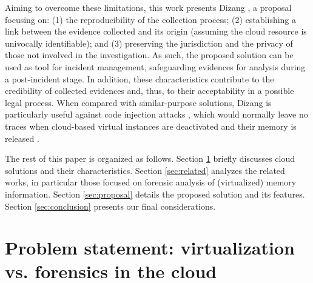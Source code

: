 \documentclass[conference]{IEEEtran}
\newcommand{\marcos}[1]{{\color{green}{MARCOS: #1}}}
\newcommand{\fancyname}{Dizang }
\newcommand{\fancynameX}{\fancyname}
\begin{document}
%
Aiming to overcome these limitations, this work presents \fancynameX, a proposal focusing on: (1) the reproducibility of the collection process; (2) establishing a link between the evidence collected and its origin (assuming the cloud resource is univocally identifiable); and (3) preserving the jurisdiction and the privacy of those not involved in the investigation.
%
As such, the proposed solution can be used as tool for incident management, safeguarding evidences for analysis during a post-incident stage.
%
In addition, these characteristics contribute to the credibility of collected evidences and, thus, to their acceptability in a possible legal process.
%
%
%
When compared with similar-purpose solutions, \fancyname is particularly useful against code injection attacks \cite{Case_Memory_Forensics:2014}, which would normally leave no traces when cloud-based virtual instances are deactivated and their memory is released \cite{Vomel_Memory_Acquisition:2013,Case_Memory_Forensics:2014}.


The rest of this paper is organized as follows.
%
Section \ref{sec:cloud} briefly discusses cloud solutions and their characteristics.
%
Section \ref{sec:related} analyzes the related works, in particular those focused on forensic analysis of (virtualized) memory information.
%
Section \ref{sec:proposal} details the proposed solution and its features.
%
Section \ref{sec:conclusion} presents our final considerations.



\section{Problem statement: virtualization vs. forensics in the cloud}
\label{sec:cloud}
\end{document}
